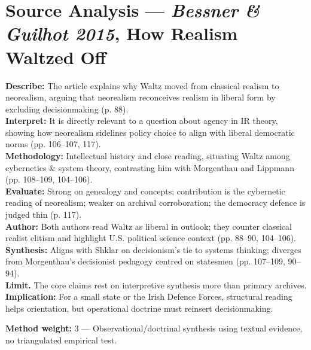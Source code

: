\section*{Source Analysis — \textit{Bessner \& Guilhot 2015}, How Realism Waltzed Off}
\textbf{Describe:} The article explains why Waltz moved from classical realism to neorealism, arguing that neorealism reconceives realism in liberal form by excluding decisionmaking (p. 88).\\
\textbf{Interpret:} It is directly relevant to a question about agency in IR theory, showing how neorealism sidelines policy choice to align with liberal democratic norms (pp. 106–107, 117).\\
\textbf{Methodology:} Intellectual history and close reading, situating Waltz among cybernetics \& system theory, contrasting him with Morgenthau and Lippmann (pp. 108–109, 104–106).\\
\textbf{Evaluate:} Strong on genealogy and concepts; contribution is the cybernetic reading of neorealism; weaker on archival corroboration; the democracy defence is judged thin (p. 117).\\
\textbf{Author:} Both authors read Waltz as liberal in outlook; they counter classical realist elitism and highlight U.S. political science context (pp. 88–90, 104–106).\\
\textbf{Synthesis:} Aligns with Shklar on decisionism’s tie to systems thinking; diverges from Morgenthau’s decisionist pedagogy centred on statesmen (pp. 107–109, 90–94).\\
\textbf{Limit.} The core claims rest on interpretive synthesis more than primary archives.\\
\textbf{Implication:} For a small state or the Irish Defence Forces, structural reading helps orientation, but operational doctrine must reinsert decisionmaking.

\textbf{Method weight:} 3 — Observational/doctrinal synthesis using textual evidence, no triangulated empirical test.

